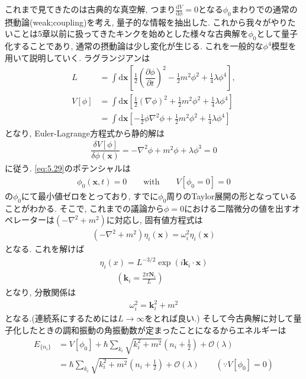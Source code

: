 \documentclass[dvipdfmx,11pt,a4paper,oneside,openany]{jsbook}
\begin{document}
これまで見てきたのは古典的な真空解, つまり$\frac{\mathrm{d}V}{\mathrm{d}\phi}=0$となる$\phi_0$まわりでの通常の摂動論(weak;coupling)を考え, 量子的な情報を抽出した. これから我々がやりたいことは5章以前に扱ってきたキンクを始めとした様々な古典解を$\phi_0$として量子化することであり, 通常の摂動論は少し変化が生じる. これを一般的な$\phi^4$模型を用いて説明していく. ラグランジアンは
\begin{align}
    L       & =\int\mathrm{d}\bm{x}\left[\frac{1}{2}\left(\dfrac{\partial \phi}{\partial t}\right)^2-\frac{1}{2}m^2\phi^2+\frac{1}{4}\lambda\phi^4\right], \\
    V[\phi] & =\int\mathrm{d}\bm{x}\left[\frac{1}{2}\left(\nabla \phi\right)^2+\frac{1}{2}m^2\phi^2+\frac{1}{4}\lambda\phi^4\right]\nonumber               \\
            & =\int\mathrm{d}\bm{x}\left[-\frac{1}{2}\phi\nabla^2\phi+\frac{1}{2}m^2\phi^2+\frac{1}{4}\lambda\phi^4\right]\label{eq:5.29}
\end{align}
となり, Euler-Lagrange方程式から静的解は
\begin{align}
    \dfrac{\delta V[\phi]}{\delta \phi(\bm{x})}=-\nabla^2\phi+m^2\phi+\lambda\phi^3=0
\end{align}
に従う. \eqref{eq:5.29}のポテンシャルは
\begin{align}
    \phi_0(\bm{x},t)=0\qquad \text{with} \qquad V[\phi_0=0]=0
\end{align}
の$\phi_0$にて最小値ゼロをとっており, すでに$\phi_0$周りのTaylor展開の形となっていることがわかる. そこで, これまでの議論から$\phi=0$における二階微分の値を出すオペレーターは$(-\nabla^2+m^2)$に対応し, 固有値方程式は
\begin{align}
    \left(-\nabla^2+m^2\right)\eta_i(\bm{x})=\omega_i^2\eta_i(\bm{x})
\end{align}
となる. これを解けば
\begin{align*}
    \eta_i(x)=L^{-3/2}\exp\left(i\bm{k}_i\cdot \bm{x}\right) \\
    \qquad \left(\bm{k}_i=\frac{2\pi\bm{N}_i}{L}\right)
\end{align*}
となり, 分散関係は
\begin{align*}
    \omega_i^2=\bm{k}_i^2+m^2
\end{align*}
となる.(連続系にするためには$L\rightarrow\infty$をとれば良い.) そして今古典解に対して量子化したときの調和振動の角振動数が定まったことになるからエネルギーは
\begin{align}
    E_{\{n_i\}} & =V[\phi_0]+\hbar\sum_{k_i}\sqrt{k_i^2+m^2}\left(n_i+\frac{1}{2}\right)+\mathcal{O}(\lambda)\nonumber                      \\
                & =\hbar\sum_{k_i}\sqrt{k_i^2+m^2}\left(n_i+\frac{1}{2}\right)+\mathcal{O}(\lambda)\qquad \left(\because V[\phi_0]=0\right)
\end{align}
\end{document}
